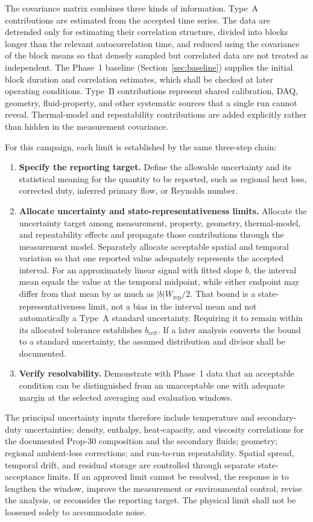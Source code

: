\documentclass[11pt]{article}
\begin{document}
The covariance matrix combines three kinds of information. Type~A contributions are estimated from the accepted time series. The data are detrended only for estimating their correlation structure, divided into blocks longer than the relevant autocorrelation time, and reduced using the covariance of the block means so that densely sampled but correlated data are not treated as independent. The Phase~1 baseline (Section~\ref{sec:baseline}) supplies the initial block duration and correlation estimates, which shall be checked at later operating conditions. Type~B contributions represent shared calibration, DAQ, geometry, fluid-property, and other systematic sources that a single run cannot reveal. Thermal-model and repeatability contributions are added explicitly rather than hidden in the measurement covariance.

For this campaign, each limit is established by the same three-step chain:
\begin{enumerate}
    \item \textbf{Specify the reporting target.} Define the allowable uncertainty and its statistical meaning for the quantity to be reported, such as regional heat loss, corrected duty, inferred primary flow, or Reynolds number.
    \item \textbf{Allocate uncertainty and state-representativeness limits.} Allocate the uncertainty target among measurement, property, geometry, thermal-model, and repeatability effects and propagate those contributions through the measurement model. Separately allocate acceptable spatial and temporal variation so that one reported value adequately represents the accepted interval. For an approximately linear signal with fitted slope $b$, the interval mean equals the value at the temporal midpoint, while either endpoint may differ from that mean by as much as $|b|W_{\mathrm{rep}}/2$. That bound is a state-representativeness limit, not a bias in the interval mean and not automatically a Type~A standard uncertainty. Requiring it to remain within its allocated tolerance establishes $b_{\mathrm{crit}}$. If a later analysis converts the bound to a standard uncertainty, the assumed distribution and divisor shall be documented.
    \item \textbf{Verify resolvability.} Demonstrate with Phase~1 data that an acceptable condition can be distinguished from an unacceptable one with adequate margin at the selected averaging and evaluation windows.
\end{enumerate}

The principal uncertainty inputs therefore include temperature and secondary-duty uncertainties; density, enthalpy, heat-capacity, and viscosity correlations for the documented Prop-30 composition and the secondary fluids; geometry; regional ambient-loss corrections; and run-to-run repeatability. Spatial spread, temporal drift, and residual storage are controlled through separate state-acceptance limits. If an approved limit cannot be resolved, the response is to lengthen the window, improve the measurement or environmental control, revise the analysis, or reconsider the reporting target. The physical limit shall not be loosened solely to accommodate noise.
\end{document}
